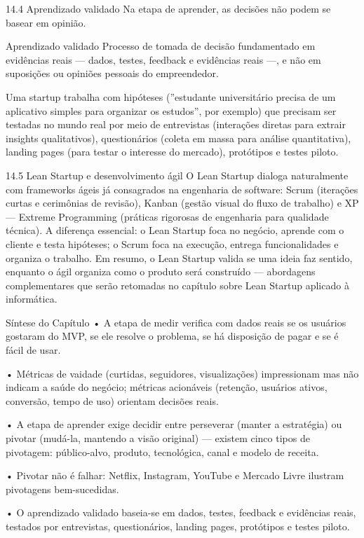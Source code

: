 14.4 Aprendizado validado Na etapa de aprender, as decisões não podem se basear em opinião.

Aprendizado validado Processo de tomada de decisão fundamentado em evidências reais — dados, testes, feedback e evidências reais —, e não em suposições ou opiniões pessoais do empreendedor.

Uma startup trabalha com hipóteses (”estudante universitário precisa de um aplicativo simples para organizar os estudos”, por exemplo) que precisam ser testadas no mundo real por meio de entrevistas (interações diretas para extrair insights qualitativos), questionários (coleta em massa para análise quantitativa), landing pages (para testar o interesse do mercado), protótipos e testes piloto.

14.5 Lean Startup e desenvolvimento ágil O Lean Startup dialoga naturalmente com frameworks ágeis já consagrados na engenharia de software: Scrum (iterações curtas e cerimônias de revisão), Kanban (gestão visual do fluxo de trabalho) e XP — Extreme Programming (práticas rigorosas de engenharia para qualidade técnica). A diferença essencial: o Lean Startup foca no negócio, aprende com o cliente e testa hipóteses; o Scrum foca na execução, entrega funcionalidades e organiza o trabalho. Em resumo, o Lean Startup valida se uma ideia faz sentido, enquanto o ágil organiza como o produto será construído — abordagens complementares que serão retomadas no capítulo sobre Lean Startup aplicado à informática.

Síntese do Capítulo • A etapa de medir verifica com dados reais se os usuários gostaram do MVP, se ele resolve o problema, se há disposição de pagar e se é fácil de usar.

• Métricas de vaidade (curtidas, seguidores, visualizações) impressionam mas não indicam a saúde do negócio; métricas acionáveis (retenção, usuários ativos, conversão, tempo de uso) orientam decisões reais.

• A etapa de aprender exige decidir entre perseverar (manter a estratégia) ou pivotar (mudá-la, mantendo a visão original) — existem cinco tipos de pivotagem: público-alvo, produto, tecnológica, canal e modelo de receita.

• Pivotar não é falhar: Netflix, Instagram, YouTube e Mercado Livre ilustram pivotagens bem-sucedidas.

• O aprendizado validado baseia-se em dados, testes, feedback e evidências reais, testados por entrevistas, questionários, landing pages, protótipos e testes piloto.

